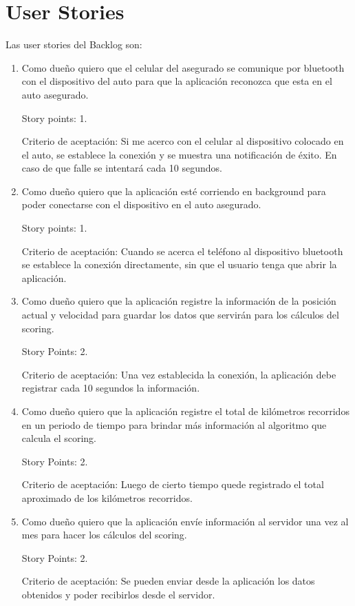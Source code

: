 \section{User Stories}

Las user stories del Backlog son:
\begin{enumerate}
\item Como dueño quiero que el celular del asegurado se comunique por bluetooth con el dispositivo del auto para que la aplicación reconozca que esta en el auto asegurado. 

Story points: 1.

Criterio de aceptación: Si me acerco con el celular al dispositivo colocado en el auto, se establece la conexión y se muestra una notificación de éxito. En caso de que falle se intentará cada 10 segundos.

\item Como dueño quiero que la aplicación esté corriendo en background para poder conectarse con el dispositivo en el auto asegurado. 

Story points: 1.

Criterio de aceptación: Cuando se acerca el teléfono al dispositivo bluetooth se establece la conexión directamente, sin que el usuario tenga que abrir la aplicación.

\item Como dueño quiero que la aplicación registre la información de la posición actual y velocidad para guardar los datos que servirán para los cálculos del scoring. 

Story Points: 2.

Criterio de aceptación: Una vez establecida la conexión, la aplicación debe registrar cada 10 segundos la información.

\item Como dueño quiero que la aplicación registre el total de kilómetros recorridos en un periodo de tiempo para brindar más información al algoritmo que calcula el scoring. 

Story Points: 2.

Criterio de aceptación: Luego de cierto tiempo quede registrado el total aproximado de los kilómetros recorridos.

\item Como dueño quiero que la aplicación envíe información al servidor una vez al mes para hacer los cálculos del scoring. 

Story Points: 2.

Criterio de aceptación:
Se pueden enviar desde la aplicación los datos obtenidos y poder recibirlos desde el servidor.

\end{enumerate}

